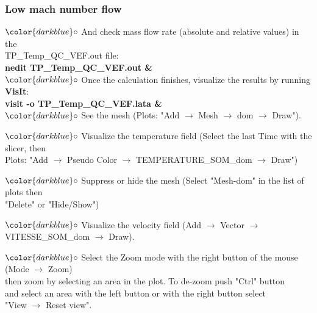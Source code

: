 \documentclass[10pt]{beamer}
\begin{document}
\begin{frame}
\frametitle{Low mach number flow}
\begin{block}{}

\hspace{1cm} $\color{darkblue}\circ$ {\small{And check mass flow rate (absolute and relative values) in the\\
\hspace{1.3cm} TP\_Temp\_QC\_VEF.out file: \\
\hspace{1.3cm} \textbf{nedit TP\_Temp\_QC\_VEF.out \&} }}\\

\hspace{1cm} $\color{darkblue}\circ$ {\small{Once the calculation finishes, visualize the results by running \textbf{VisIt}:\\
\hspace{1.3cm} \textbf{visit -o TP\_Temp\_QC\_VEF.lata \&} }}\\

\hspace{1cm} $\color{darkblue}\circ$ {\small{See the mesh (Plots: "Add $\rightarrow$ Mesh $\rightarrow$ dom $\rightarrow$ Draw").}}

\hspace{1cm} $\color{darkblue}\circ$ {\small{Visualize the temperature field (Select the last Time with the slicer, then  \\
\hspace{1.3cm} Plots: "Add $\rightarrow$ Pseudo Color $\rightarrow$ TEMPERATURE\_SOM\_dom  $\rightarrow$ Draw")}}

\hspace{1cm} $\color{darkblue}\circ$ {\small{Suppress or hide the mesh (Select "Mesh-dom" in the list of plots then \\
\hspace{1.3cm} "Delete" or "Hide/Show")}}

\hspace{1cm} $\color{darkblue}\circ$ {\small{Visualize the velocity field (Add $\rightarrow$ Vector $\rightarrow$ VITESSE\_SOM\_dom $\rightarrow$ Draw).}}

\hspace{1cm} $\color{darkblue}\circ$ {\small{Select the Zoom mode with the right button of the mouse (Mode $\rightarrow$ Zoom) \\
\hspace{1.3cm} then zoom by selecting an area in the plot. To de-zoom push "Ctrl" button \\
\hspace{1.3cm} and select an area with the left button or with the right button select \\
\hspace{1.3cm} "View $\rightarrow$ Reset view".}}


\end{block}
\end{frame}
\end{document}
